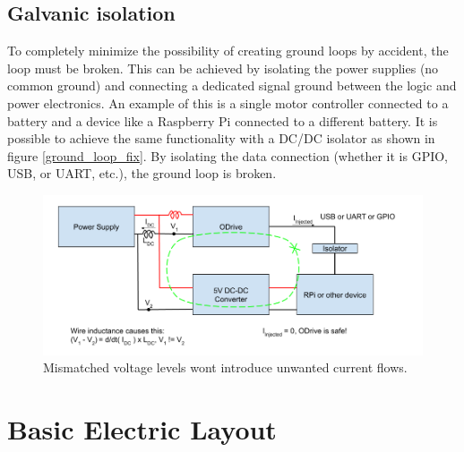     \subsection{Galvanic isolation}
    
    To completely minimize the possibility of creating ground loops by accident, the loop must be broken. This can be achieved by isolating the power supplies (no common ground) and connecting a dedicated signal ground between the logic and power electronics. An example of this is a single motor controller connected to a battery and a device like a Raspberry Pi connected to a different battery. It is possible to achieve the same functionality with a DC/DC isolator as shown in figure \ref{ground_loop_fix}. By isolating the data connection (whether it is GPIO, USB, or UART, etc.), the ground loop is broken.
    
    \begin{figure}[h] %
        \includegraphics[width=\textwidth]{contents/figures/ground_loop_fix.png}
        \caption{Mismatched voltage levels wont introduce unwanted current flows.}
        \label{fig:ground_loop_fix}
    \end{figure}

    \clearpage %
    
\section{Basic Electric Layout}

